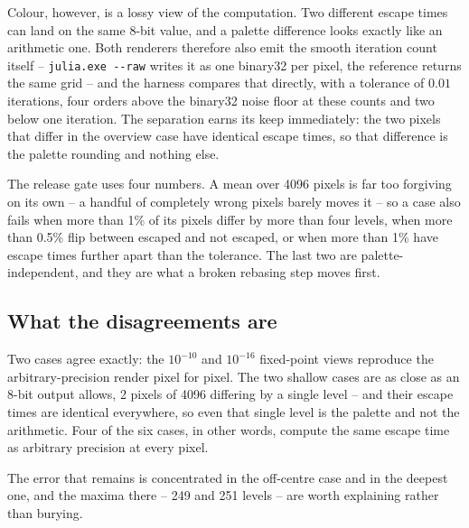 \documentclass[10pt,a4paper]{article}
\begin{document}
Colour, however, is a lossy view of the computation. Two different escape times
can land on the same 8-bit value, and a palette difference looks exactly like
an arithmetic one. Both renderers therefore also emit the smooth iteration
count itself -- \texttt{julia.exe -{}-raw} writes it as one binary32 per pixel,
the reference returns the same grid -- and the harness compares that directly,
with a tolerance of \(0.01\) iterations, four orders above the binary32 noise
floor at these counts and two below one iteration. The separation earns its
keep immediately: the two pixels that differ in the overview case have
identical escape times, so that difference is the palette rounding and nothing
else.

The release gate uses four numbers. A mean over 4096 pixels is far too
forgiving on its own -- a handful of completely wrong pixels barely moves it --
so a case also fails when more than 1\% of its pixels differ by more than four
levels, when more than 0.5\% flip between escaped and not escaped, or when more
than 1\% have escape times further apart than the tolerance. The last two are
palette-independent, and they are what a broken rebasing step moves first.

\begin{table}[H]
  \centering
  \small
  \caption{CUDA perturbation output against direct \texttt{mpmath} rendering,
  read from the archived \texttt{validation\_results.csv}. Errors are 8-bit RGB
  levels; counts are out of the 4096 pixels of each \(64\times64\) case.
  \emph{Flips} counts pixels the two implementations disagree about escaping at
  all, the one column a palette cannot influence.}
  \label{tab:validation}
  
\end{table}

\subsection{What the disagreements are}

Two cases agree exactly: the \(10^{-10}\) and \(10^{-16}\) fixed-point views
reproduce the arbitrary-precision render pixel for pixel. The two shallow cases
are as close as an 8-bit output allows, 2 pixels of 4096 differing by a single
level -- and their escape times are identical everywhere, so even that single
level is the palette and not the arithmetic. Four of the six cases, in other
words, compute the same escape time as arbitrary precision at every pixel.

The error that remains is concentrated in the off-centre case and in the
deepest one, and the maxima there -- 249 and 251 levels -- are worth explaining
rather than burying.
\end{document}
